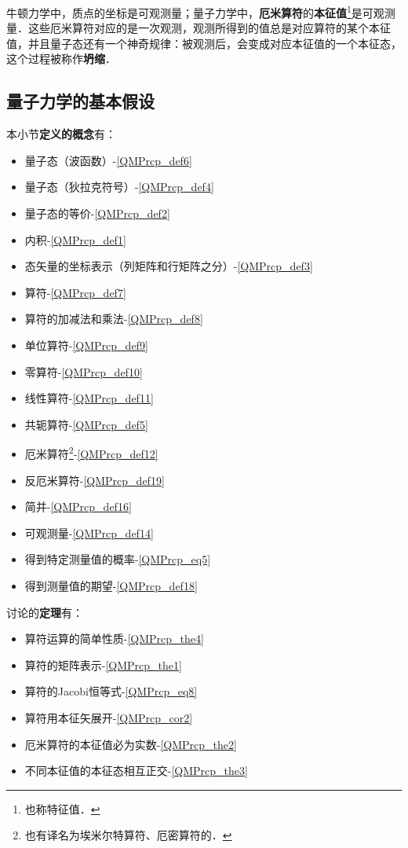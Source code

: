 牛顿力学中，质点的坐标是可观测量；量子力学中，\textbf{厄米算符}的\textbf{本征值}\footnote{也称特征值．}是可观测量．这些厄米算符对应的是一次观测，观测所得到的值总是对应算符的某个本征值，并且量子态还有一个神奇规律：被观测后，会变成对应本征值的一个本征态，这个过程被称作\textbf{坍缩}．



\subsection{量子力学的基本假设}\label{QMPrcp_sub2}

本小节\textbf{定义的概念}有：

\begin{itemize}
\item 量子态（波函数）-\autoref{QMPrcp_def6} 
\item 量子态（狄拉克符号）-\autoref{QMPrcp_def4} 
\item 量子态的等价-\autoref{QMPrcp_def2} 
\item 内积-\autoref{QMPrcp_def1} 
\item 态矢量的坐标表示（列矩阵和行矩阵之分）-\autoref{QMPrcp_def3} 
\item 算符-\autoref{QMPrcp_def7} 
\item 算符的加减法和乘法-\autoref{QMPrcp_def8} 
\item 单位算符-\autoref{QMPrcp_def9} 
\item 零算符-\autoref{QMPrcp_def10} 
\item 线性算符-\autoref{QMPrcp_def11} 
\item 共轭算符-\autoref{QMPrcp_def5} 
\item 厄米算符\footnote{也有译名为埃米尔特算符、厄密算符的．}-\autoref{QMPrcp_def12} 
\item 反厄米算符-\autoref{QMPrcp_def19} 
\item 简并-\autoref{QMPrcp_def16} 
\item 可观测量-\autoref{QMPrcp_def14} 
\item 得到特定测量值的概率-\autoref{QMPrcp_eq5} 
\item 得到测量值的期望-\autoref{QMPrcp_def18} 
\end{itemize}


讨论的\textbf{定理}有：

\begin{itemize}
\item 算符运算的简单性质-\autoref{QMPrcp_the4} 
\item 算符的矩阵表示-\autoref{QMPrcp_the1} 
\item 算符的Jacobi恒等式-\autoref{QMPrcp_eq8} 
\item 算符用本征矢展开-\autoref{QMPrcp_cor2} 
\item 厄米算符的本征值必为实数-\autoref{QMPrcp_the2} 
\item 不同本征值的本征态相互正交-\autoref{QMPrcp_the3} 
\end{itemize}




